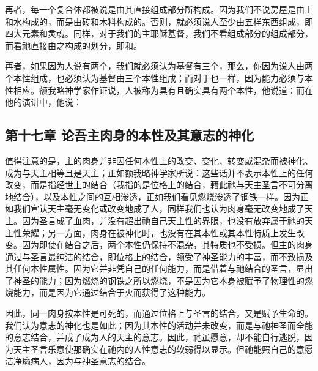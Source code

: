 再者，每一个复合体都被说是由其直接组成部分所构成。因为我们不说房屋是由土和水构成的，而是由砖和木料构成的。否则，就必须说人至少由五样东西组成，即四大元素和灵魂。同样，对于我们的主耶稣基督，我们不看组成部分的组成部分，而看祂直接由之构成的划分，即和。\par

再者，如果因为人说有两个，我们就必须认为基督有三个，那么，你因为说人由两个本性组成，也必须认为基督由三个本性组成；而对于也一样，因为能力必须与本性相应。额我略神学家作证说，人被称为具有且确实具有两个本性，他说道：而在他的演讲中，他说：\par


\subsection{第十七章 论吾主肉身的本性及其意志的神化}

值得注意的是，主的肉身并非因任何本性上的改变、变化、转变或混杂而被神化、成为与天主相等且是天主；正如额我略神学家所说：这些话并不表示本性上的任何改变，而是指经世上的结合（我指的是位格上的结合，藉此祂与天主圣言不可分离地结合），以及本性之间的互相渗透，正如我们看见燃烧渗透了钢铁一样。因为正如我们宣认天主毫无变化或改变地成了人，同样我们也认为肉身毫无改变地成了天主。因为圣言成了血肉，并没有超出祂自己天主性的界限，也没有放弃属于祂的天主性荣耀；另一方面，肉身在被神化时，也没有在其本性或其本性特质上发生改变。因为即使在结合之后，两个本性仍保持不混杂，其特质也不受损。但主的肉身通过与圣言最纯洁的结合，即位格上的结合，领受了神圣能力的丰富，而不致损及其任何本性属性。因为它并非凭自己的任何能力，而是借着与祂结合的圣言，显出了神圣的能力；因为燃烧的钢铁之所以燃烧，不是因为它本身被赋予了物理性的燃烧能力，而是因为它通过结合于火而获得了这种能力。\par

因此，同一肉身按本性是可死的，而通过位格上与圣言的结合，又是赋予生命的。我们认为意志的神化也是如此；因为其本性的活动并未改变，而是与祂神圣而全能的意志结合，并成了成为人的天主的意志。因此，祂虽愿意，却不能自行逃脱，因为天主圣言乐意使那确实在祂内的人性意志的软弱得以显示。但祂能照自己的意愿洁净癞病人，因为与神圣意志的结合。\par

